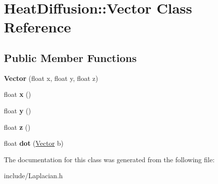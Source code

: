 \hypertarget{classHeatDiffusion_1_1Vector}{\section{Heat\-Diffusion\-:\-:Vector Class Reference}
\label{classHeatDiffusion_1_1Vector}
}
\subsection*{Public Member Functions}
\begin{DoxyCompactItemize}
\item 
\hypertarget{classHeatDiffusion_1_1Vector_af9cec0158ea26efdf0166427f3eaca32}{{\bfseries Vector} (float x, float y, float z)}\label{classHeatDiffusion_1_1Vector_af9cec0158ea26efdf0166427f3eaca32}

\item 
\hypertarget{classHeatDiffusion_1_1Vector_a9ce12c96a47c4d56dca868c95918884a}{float {\bfseries x} ()}\label{classHeatDiffusion_1_1Vector_a9ce12c96a47c4d56dca868c95918884a}

\item 
\hypertarget{classHeatDiffusion_1_1Vector_ac6749fe2512a98d50d78f766b8e7bb06}{float {\bfseries y} ()}\label{classHeatDiffusion_1_1Vector_ac6749fe2512a98d50d78f766b8e7bb06}

\item 
\hypertarget{classHeatDiffusion_1_1Vector_a3384d5c7b399de71f8472d4cfbb744cb}{float {\bfseries z} ()}\label{classHeatDiffusion_1_1Vector_a3384d5c7b399de71f8472d4cfbb744cb}

\item 
\hypertarget{classHeatDiffusion_1_1Vector_a61f7dcde731e177c6b6fb11c0a66618c}{float {\bfseries dot} (\hyperlink{classHeatDiffusion_1_1Vector}{Vector} b)}\label{classHeatDiffusion_1_1Vector_a61f7dcde731e177c6b6fb11c0a66618c}

\end{DoxyCompactItemize}


The documentation for this class was generated from the following file\-:\begin{DoxyCompactItemize}
\item 
include/Laplacian.\-h\end{DoxyCompactItemize}

